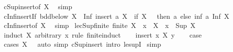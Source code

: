 \begin{isabellebody}
\ cSup{\isacharunderscore}{\kern0pt}insert{\isacharbrackleft}{\kern0pt}of\ X{\isacharbrackright}{\kern0pt}\ \isamarkupfalse%
\ simp%
\endisatagproof
{\isafoldproof}%
%
\isadelimproof
\isanewline
%
\endisadelimproof
\isanewline
{}\isamarkupfalse%
\ cInf{\isacharunderscore}{\kern0pt}insert{\isacharunderscore}{\kern0pt}If{\isacharcolon}{\kern0pt}\ {\isachardoublequoteopen}bdd{\isacharunderscore}{\kern0pt}below\ X\ {\isasymLongrightarrow}\ Inf\ {\isacharparenleft}{\kern0pt}insert\ a\ X{\isacharparenright}{\kern0pt}\ {\isacharequal}{\kern0pt}\ {\isacharparenleft}{\kern0pt}if\ X\ {\isacharequal}{\kern0pt}\ {\isacharbraceleft}{\kern0pt}{\isacharbraceright}{\kern0pt}\ then\ a\ else\ inf\ a\ {\isacharparenleft}{\kern0pt}Inf\ X{\isacharparenright}{\kern0pt}{\isacharparenright}{\kern0pt}{\isachardoublequoteclose}\isanewline
%
\isadelimproof
\ \ %
\endisadelimproof
%
\isatagproof
{}\isamarkupfalse%
\ cInf{\isacharunderscore}{\kern0pt}insert{\isacharbrackleft}{\kern0pt}of\ X{\isacharbrackright}{\kern0pt}\ \isamarkupfalse%
\ simp%
\endisatagproof
{\isafoldproof}%
%
\isadelimproof
\isanewline
%
\endisadelimproof
\isanewline
{}\isamarkupfalse%
\ le{\isacharunderscore}{\kern0pt}cSup{\isacharunderscore}{\kern0pt}finite{\isacharcolon}{\kern0pt}\ {\isachardoublequoteopen}finite\ X\ {\isasymLongrightarrow}\ x\ {\isasymin}\ X\ {\isasymLongrightarrow}\ x\ {\isasymle}\ Sup\ X{\isachardoublequoteclose}\isanewline
%
\isadelimproof
%
\endisadelimproof
%
\isatagproof
{}\isamarkupfalse%
\ {\isacharparenleft}{\kern0pt}induct\ X\ arbitrary{\isacharcolon}{\kern0pt}\ x\ rule{\isacharcolon}{\kern0pt}\ finite{\isacharunderscore}{\kern0pt}induct{\isacharparenright}{\kern0pt}\isanewline
\ \ \isamarkupfalse%
\ {\isacharparenleft}{\kern0pt}insert\ x\ X\ y{\isacharparenright}{\kern0pt}\ \isamarkupfalse%
\ \isamarkupfalse%
\ {\isacharquery}{\kern0pt}case\isanewline
\ \ \ \ \isamarkupfalse%
\ {\isacharparenleft}{\kern0pt}cases\ {\isachardoublequoteopen}X\ {\isacharequal}{\kern0pt}\ {\isacharbraceleft}{\kern0pt}{\isacharbraceright}{\kern0pt}{\isachardoublequoteclose}{\isacharparenright}{\kern0pt}\ {\isacharparenleft}{\kern0pt}auto\ simp{\isacharcolon}{\kern0pt}\ cSup{\isacharunderscore}{\kern0pt}insert\ intro{\isacharcolon}{\kern0pt}\ le{\isacharunderscore}{\kern0pt}supI{}{\isacharparenright}{\kern0pt}\isanewline
{}\isamarkupfalse%
\ simp%
\endisatagproof
{\isafoldproof}%
%
\isadelimproof
\isanewline
%
\endisadelimproof

\end{isabellebody}
